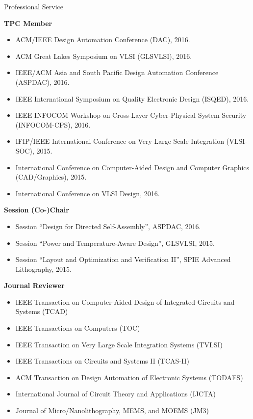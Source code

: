 
\begin{rSection}{Professional Service}

\textbf{TPC Member}
\begin{itemize}
    \item ACM/IEEE Design Automation Conference (DAC), 2016.
    \item ACM Great Lakes Symposium on VLSI (GLSVLSI), 2016.
    \item IEEE/ACM Asia and South Pacific Design Automation Conference (ASPDAC), 2016.
    \item IEEE International Symposium on Quality Electronic Design (ISQED), 2016.
    \item IEEE INFOCOM Workshop on Cross-Layer Cyber-Physical System Security (INFOCOM-CPS), 2016.
    \item IFIP/IEEE International Conference on Very Large Scale Integration (VLSI-SOC), 2015.
    \item International Conference on Computer-Aided Design and Computer Graphics (CAD/Graphics), 2015.
    \item International Conference on VLSI Design, 2016.
\end{itemize}

\textbf{Session (Co-)Chair}
\begin{itemize}
    \item Session ``Design for Directed Self-Assembly'', ASPDAC, 2016.
    \item Session ``Power and Temperature-Aware Design'', GLSVLSI, 2015.
    \item Session ``Layout and Optimization and Verification II'', SPIE Advanced Lithography, 2015.
\end{itemize}

\textbf{Journal Reviewer}
\begin{itemize}
    \item IEEE Transaction on Computer-Aided Design of Integrated Circuits and Systems (TCAD)
    \item IEEE Transactions on Computers (TOC)
    \item IEEE Transaction on Very Large Scale Integration Systems (TVLSI)
    \item IEEE Transactions on Circuits and Systems II (TCAS-II)
    \item ACM Transaction on Design Automation of Electronic Systems (TODAES)
    \item International Journal of Circuit Theory and Applications (IJCTA)
    \item Journal of Micro/Nanolithography, MEMS, and MOEMS (JM3)
\end{itemize}


\end{rSection}
